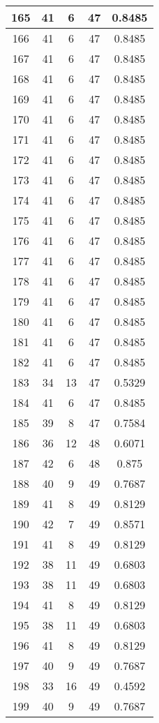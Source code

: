 \documentclass[letterpaper, 12pt]{article}
\begin{document}
\begin{longtable}{|c|c|c|c|c|}
\hline
165 & 41 & 6 & 47 & 0.8485 \\
\hline
166 & 41 & 6 & 47 & 0.8485 \\
\hline
167 & 41 & 6 & 47 & 0.8485 \\
\hline
168 & 41 & 6 & 47 & 0.8485 \\
\hline
169 & 41 & 6 & 47 & 0.8485 \\
\hline
170 & 41 & 6 & 47 & 0.8485 \\
\hline
171 & 41 & 6 & 47 & 0.8485 \\
\hline
172 & 41 & 6 & 47 & 0.8485 \\
\hline
173 & 41 & 6 & 47 & 0.8485 \\
\hline
174 & 41 & 6 & 47 & 0.8485 \\
\hline
175 & 41 & 6 & 47 & 0.8485 \\
\hline
176 & 41 & 6 & 47 & 0.8485 \\
\hline
177 & 41 & 6 & 47 & 0.8485 \\
\hline
178 & 41 & 6 & 47 & 0.8485 \\
\hline
179 & 41 & 6 & 47 & 0.8485 \\
\hline
180 & 41 & 6 & 47 & 0.8485 \\
\hline
181 & 41 & 6 & 47 & 0.8485 \\
\hline
182 & 41 & 6 & 47 & 0.8485 \\
\hline
183 & 34 & 13 & 47 & 0.5329 \\
\hline
184 & 41 & 6 & 47 & 0.8485 \\
\hline
185 & 39 & 8 & 47 & 0.7584 \\
\hline
186 & 36 & 12 & 48 & 0.6071 \\
\hline
187 & 42 & 6 & 48 & 0.875 \\
\hline
188 & 40 & 9 & 49 & 0.7687 \\
\hline
189 & 41 & 8 & 49 & 0.8129 \\
\hline
190 & 42 & 7 & 49 & 0.8571 \\
\hline
191 & 41 & 8 & 49 & 0.8129 \\
\hline
192 & 38 & 11 & 49 & 0.6803 \\
\hline
193 & 38 & 11 & 49 & 0.6803 \\
\hline
194 & 41 & 8 & 49 & 0.8129 \\
\hline
195 & 38 & 11 & 49 & 0.6803 \\
\hline
196 & 41 & 8 & 49 & 0.8129 \\
\hline
197 & 40 & 9 & 49 & 0.7687 \\
\hline
198 & 33 & 16 & 49 & 0.4592 \\
\hline
199 & 40 & 9 & 49 & 0.7687 \\
\hline
\end{longtable}
\end{document}
